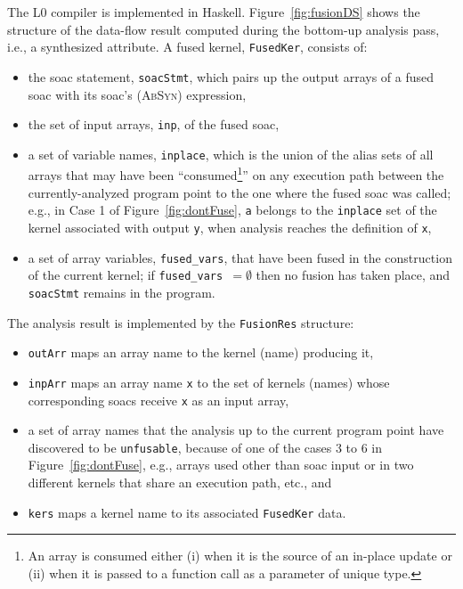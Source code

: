 \documentclass{sigplanconf}  %
\newcommand{\emp}[1]{\textcolor{DikuRed}{ #1}}
\begin{document}
The L0 compiler is implemented in Haskell.  Figure~\ref{fig:fusionDS}
shows the structure of the data-flow result computed during the
bottom-up analysis pass, i.e., a synthesized attribute.  A fused
kernel, \emp{\tt FusedKer}, consists of:
\begin{itemize}
    \item the {\sc soac} statement, {\tt soacStmt}, which pairs up
            the output arrays of a fused {\sc soac} 
            with its {\sc soac}'s (\textsc{AbSyn}) expression,
    \item the set of input arrays, {\tt inp}, of the fused {\sc soac},
    \item a set of variable names, {\tt inplace}, which is
            the union of the alias sets of all arrays that may have 
            been ``consumed\footnote{
                An array is consumed either (i) when it is the 
                source of an in-place update or (ii) when it is passed 
                to a function call as a parameter of unique type. 
            }''
            on any execution path between the currently-analyzed program 
            point to the one where the fused {\sc soac} was called; e.g.,
            in \emp{Case 1} of Figure~\ref{fig:dontFuse}, {\tt a}
            belongs to the {\tt inplace} set of the kernel associated
            with output {\tt y}, when analysis reaches 
            the definition of {\tt x},
    \item a set of array variables, {\tt fused\_vars}, that have been 
            fused in the construction of the current kernel;
            if {\tt fused\_vars $=\emptyset$} then no fusion has
            taken place, and {\tt soacStmt} remains in the program.       
\end{itemize}

The analysis result is implemented by the \emp{\tt FusionRes} structure: 
\begin{itemize}
    \item {\tt outArr} maps an array name to the kernel (name) producing it, 
    \item {\tt inpArr} maps an array name {\tt x} to the set of kernels (names) 
            whose corresponding {\sc soac}s receive {\tt x} as an input array,
    \item a set of array names that the analysis up to the current 
            program point have discovered to be {\tt unfusable}, because
            of one of the \emp{cases 3 to 6} in Figure~\ref{fig:dontFuse},
            e.g., arrays used other than {\sc soac} input or
            in two different kernels that share an execution path, etc., and
    \item {\tt kers} maps a kernel name to its associated \emp{\tt FusedKer} data.
\end{itemize}
\end{document}
